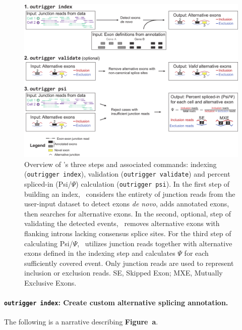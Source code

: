 \begin{figure}[h]
  \centering
  \includegraphics[width=5.8in]{figures/outrigger_overview.pdf}
  \caption[Overview of \outrigger's three steps and associated commands: indexing (\texttt{outrigger index}), validation (\texttt{outrigger validate}) and percent spliced-in (Psi/$\Psi$) calculation (\texttt{outrigger psi})]{Overview of \outrigger's three steps and associated commands: indexing (\texttt{outrigger index}), validation (\texttt{outrigger validate}) and percent spliced-in (Psi/$\Psi$) calculation (\texttt{outrigger psi}). In the first step of building an index, \outrigger\, considers the entirety of junction reads from the user-input dataset to detect exons \emph{de novo}, adds annotated exons, then searches for alternative exons. In the second, optional, step of validating the detected events, \outrigger\, removes alternative exons with flanking introns lacking consensus splice sites. For the third step of calculating Psi/$\Psi$, \outrigger\, utilizes junction reads together with alternative exons defined in the indexing step and calculates $\Psi$ for each sufficiently covered event. Only junction reads are used to represent inclusion or exclusion reads. SE, Skipped Exon; MXE, Mutually Exclusive Exons.
  }
  \label{fig:outrigger_overview}
\end{figure}




\paragraph{\texttt{outrigger index}: Create custom alternative splicing annotation.} The following is a narrative describing \textbf{Figure~a}.


